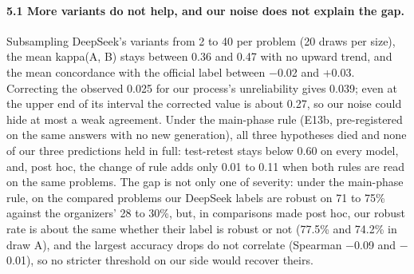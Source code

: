 \paragraph{5.1 More variants do not help, and our noise does not explain the gap.}
Subsampling DeepSeek's variants from 2 to 40 per problem (20 draws per size), the mean kappa(A, B) stays between 0.36 and 0.47 with no upward trend, and the mean concordance with the official label between $-$0.02 and +0.03. Correcting the observed 0.025 for our process's unreliability gives 0.039; even at the upper end of its interval the corrected value is about 0.27, so our noise could hide at most a weak agreement. Under the main-phase rule (E13b, pre-registered on the same answers with no new generation), all three hypotheses died and none of our three predictions held in full: test-retest stays below 0.60 on every model, and, post hoc, the change of rule adds only 0.01 to 0.11 when both rules are read on the same problems. The gap is not only one of severity: under the main-phase rule, on the compared problems our DeepSeek labels are robust on 71 to 75\% against the organizers' 28 to 30\%, but, in comparisons made post hoc, our robust rate is about the same whether their label is robust or not (77.5\% and 74.2\% in draw A), and the largest accuracy drops do not correlate (Spearman $-$0.09 and $-$0.01), so no stricter threshold on our side would recover theirs.

